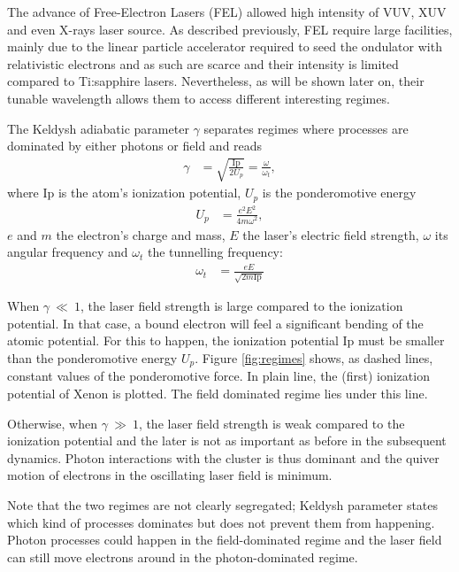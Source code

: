 The advance of Free-Electron Lasers (FEL) allowed high intensity of VUV, XUV and
even X-rays laser source. As described previously, FEL require large facilities,
mainly due to the linear particle accelerator required to seed the ondulator
with relativistic electrons and as such are scarce and their intensity is limited
compared to Ti:sapphire lasers. Nevertheless, as will be shown later on, their
tunable wavelength allows them to access different interesting regimes.

The Keldysh adiabatic parameter $\gamma$ separates regimes where processes are
dominated by either photons or field\cite{Long2010} and reads
\begin{align}
\gamma & = \sqrt{ \frac{\textrm{Ip}}{2 U_p} } = \frac{\omega}{\omega_t},
\end{align}
where Ip is the atom's ionization potential, $U_p$ is the ponderomotive energy
\begin{align}
U_p & = \frac{e^2 E^2}{4 m \omega^2},
\end{align}
$e$ and $m$ the electron's charge and mass, $E$ the laser's electric field
strength, $\omega$ its angular frequency and $\omega_t$ the tunnelling
frequency:
\begin{align}
\omega_t & = \frac{e E}{\sqrt{2 m \textrm{Ip}}}
\end{align}


When $\gamma~\ll~1$, the laser field strength is large compared to the ionization
potential. In that case, a bound electron will feel a significant bending of the
atomic potential. For this to happen, the ionization potential Ip must be
smaller than the ponderomotive energy $U_p$. Figure \ref{fig:regimes} shows,
as dashed lines, constant values of the ponderomotive force. In plain line,
the (first) ionization potential of Xenon is plotted. The field dominated regime
lies under this line.

Otherwise, when $\gamma~\gg~1$, the laser field strength is weak compared to
the ionization potential and the later is not as important as before in the
subsequent dynamics. Photon interactions with the cluster is thus dominant and
the quiver motion of electrons in the oscillating laser field is minimum.

Note that the two regimes are not clearly segregated; Keldysh parameter states
which kind of processes dominates but does not prevent them from happening.
Photon processes could happen in the field-dominated regime and the laser field
can still move electrons around in the photon-dominated regime.

